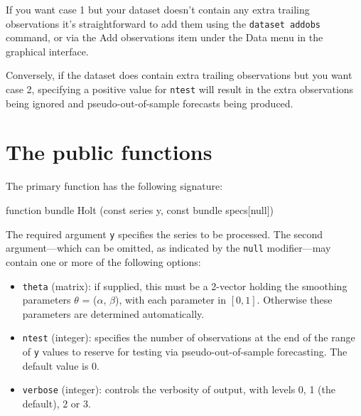 \documentclass{article}
\begin{document}
If you want case 1 but your dataset doesn't contain any extra trailing
observations it's straightforward to add them using the
\texttt{dataset addobs} command, or via the \textsf{Add observations}
item under the \textsf{Data} menu in the graphical interface.

Conversely, if the dataset does contain extra trailing observations
but you want case 2, specifying a positive value for \texttt{ntest}
will result in the extra observations being ignored and
pseudo-out-of-sample forecasts being produced.

\section{The public functions}

The primary function has the following signature:
\begin{nscode}
function bundle Holt (const series y, const bundle specs[null])
\end{nscode}

The required argument \texttt{y} specifies the series to be processed.
The second argument---which can be omitted, as indicated by the
\texttt{null} modifier---may contain one or more of the following
options:

\begin{itemize}
\item \texttt{theta} (matrix): if supplied, this must be a 2-vector
  holding the smoothing parameters $\theta$ = ($\alpha$, $\beta$), with
  each parameter in $[0,1]$. Otherwise these parameters are determined
  automatically.
\item \texttt{ntest} (integer): specifies the number of
  observations at the end of the range of \texttt{y} values to reserve
  for testing via pseudo-out-of-sample forecasting. The default value
  is 0.
\item \texttt{verbose} (integer): controls the verbosity of output, with
  levels 0, 1 (the default), 2 or 3.
\end{itemize}
\end{document}
